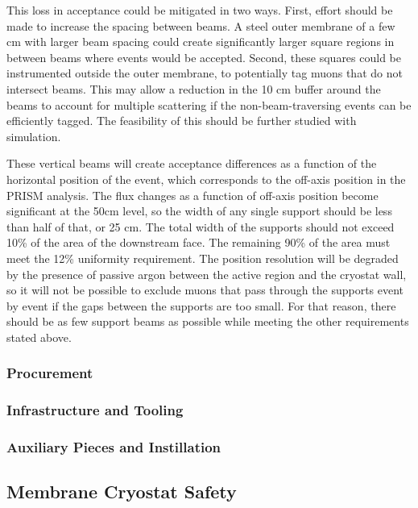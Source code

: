 This loss in acceptance could be mitigated in two ways. First, effort should be made to increase the spacing between beams. A steel outer membrane of a few cm with larger beam spacing could create significantly larger square regions in between beams where events would be accepted. Second, these squares could be instrumented outside the outer membrane, to potentially tag muons that do not intersect beams. This may allow a reduction in the 10 cm buffer around the beams to account for multiple scattering if the non-beam-traversing events can be efficiently tagged. The feasibility of this should be further studied with simulation.

These vertical beams will create acceptance differences as a function of the horizontal position of the event, which corresponds to the off-axis position in the PRISM analysis. The flux changes as a function of off-axis position become significant at the 50cm level, so the width of any single support should be less than half of that, or 25 cm. The total width of the supports should not exceed 10\% of the area of the downstream face. The remaining 90\% of the area must meet the 12\% uniformity requirement. The position resolution will be degraded by the presence of passive argon between the active region and the cryostat wall, so it will not be possible to exclude muons that pass through the supports event by event if the gaps between the supports are too small. For that reason, there should be as few support beams as possible while meeting the other requirements stated above.



\subsubsection{Procurement}

\subsubsection{Infrastructure and Tooling}

\subsubsection{Auxiliary Pieces and Instillation}


\subsection{Membrane Cryostat Safety}
\label{sec:cryost-des-safety}

